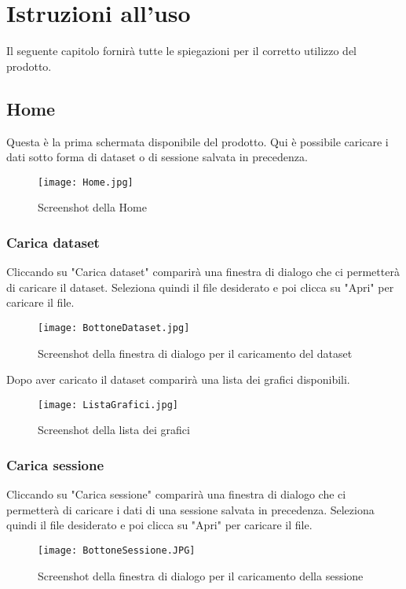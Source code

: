 \chapter{Istruzioni all'uso}
Il seguente capitolo fornirà tutte le spiegazioni per il corretto utilizzo del prodotto.

\section{Home}
Questa è la prima schermata disponibile del prodotto. Qui è possibile caricare i dati sotto forma di dataset o di sessione salvata in precedenza.

\begin{figure}[H]
    \texttt{[image: Home.jpg]}
    \caption{Screenshot della Home}
\end{figure}

\subsection{Carica dataset}
Cliccando su "Carica dataset" comparirà una finestra di dialogo che ci permetterà di caricare il dataset. Seleziona quindi il file desiderato e poi clicca su "Apri" per caricare il file.

\begin{figure}[H]
    \texttt{[image: BottoneDataset.jpg]}
    \caption{Screenshot della finestra di dialogo per il caricamento del dataset}
\end{figure}

Dopo aver caricato il dataset comparirà una lista dei grafici disponibili.

\begin{figure}[H]
    \texttt{[image: ListaGrafici.jpg]}
    \caption{Screenshot della lista dei grafici}
\end{figure}

\subsection{Carica sessione}
Cliccando su "Carica sessione" comparirà una finestra di dialogo che ci permetterà di caricare i dati di una sessione salvata in precedenza. Seleziona quindi il file desiderato e poi clicca su "Apri" per caricare il file.

\begin{figure}[H]
    \texttt{[image: BottoneSessione.JPG]}
    \caption{Screenshot della finestra di dialogo per il caricamento della sessione}
\end{figure}

